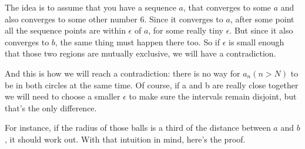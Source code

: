 \begin{proofidea}
  The idea is to assume that you have a sequence $a$, that converges
  to some $a$ and also converges to some other number 6. Since it
  converges to $a$, after some point all the sequence points are
  within $\epsilon$ of $a$, for some really tiny $\epsilon$. But
  since it also converges to $b$, the same thing must happen there
  too. So if $\epsilon$ is small enough that those two regions are
  mutually exclusive, we will have a contradiction.

  \begin{tightfigure}
    \centering
  \end{tightfigure}

  And this is how we will reach a contradiction: there is no way for
  $a_n (n > N)$ to be in both circles at the same time. Of course, if
  a and b are really close together we will need to choose a smaller
  $\epsilon$ to make sure the intervals remain disjoint, but that's
  the only difference.

  \begin{tightfigure}
    \centering
  \end{tightfigure}

  For instance, if the radius of those balls is a third of the
  distance between $a$ and $b$, it should work out. With that
  intuition in mind, here's the proof.
\end{proofidea}


